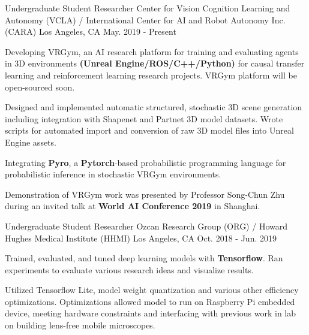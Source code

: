

\begin{cventries}

  \cventry
    {Undergraduate Student Researcher}
    {Center for Vision Cognition Learning and Autonomy (VCLA) / \newline
    International Center for AI and Robot Autonomy Inc. (CARA)} %
    {Los Angeles, CA} %
    {May. 2019 - Present} %
    {
    \begin{cvitems} %
        \item {Developing VRGym, an AI research platform for training and evaluating agents in
        3D environments \textbf{(Unreal Engine/ROS/C++/Python)} for causal transfer learning and 
        reinforcement learning research projects. VRGym platform will be open-sourced soon.} 
        \item {Designed and implemented automatic structured, stochastic 3D scene generation including integration with Shapenet and Partnet 
        3D model datasets. 
        Wrote scripts for automated import and conversion of raw 3D model files into Unreal Engine assets.}
        \item {Integrating \textbf{Pyro}, a \textbf{Pytorch}-based probabilistic programming language for probabilistic inference in stochastic VRGym environments.}
        \item {Demonstration of VRGym work was presented by Professor Song-Chun Zhu during an invited talk at \textbf{World AI Conference 2019} in Shanghai.}
    \end{cvitems}
    }

  

  \cventry
  {Undergraduate Student Researcher}
  {Ozcan Research Group (ORG) / Howard Hughes Medical Institute (HHMI)} %
  {Los Angeles, CA} %
  {Oct. 2018 - Jun. 2019} %
  {
    \begin{cvitems} %
      \item {Trained, evaluated, and tuned deep learning models with \textbf{Tensorflow}. Ran 
      experiments to evaluate various research ideas and visualize results.}
      \item Utilized Tensorflow Lite, model weight quantization and various other efficiency optimizations. Optimizations 
      allowed model to run on Raspberry Pi embedded device, meeting hardware constraints and interfacing with 
      previous work in lab on building lens-free mobile microscopes.
    \end{cvitems}
  }

  
\end{cventries}
